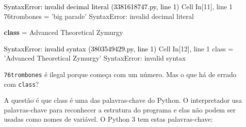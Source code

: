 \documentclass[
  brazilian,
  letterpaper,
  DIV=11,
  numbers=noendperiod]{scrreprt}
\newenvironment{Shaded}{\begin{snugshade}}{\end{snugshade}}
\newcommand{\KeywordTok}[1]{\textcolor[rgb]{0.00,0.23,0.31}{\textbf{#1}}}
\newcommand{\OperatorTok}[1]{\textcolor[rgb]{0.37,0.37,0.37}{#1}}
\newcommand{\StringTok}[1]{\textcolor[rgb]{0.13,0.47,0.30}{#1}}
\begin{document}
\begin{Highlighting}
\textcolor{black}{SyntaxError: invalid decimal literal (3381618747.py, line 1)}
\textcolor{black}{  }\textcolor{QuartoInternalColor1}{Cell}\textcolor{QuartoInternalColor2}{}\textcolor{QuartoInternalColor1}{ }\textcolor{QuartoInternalColor2}{}\textcolor{QuartoInternalColor3}{In[11]}\textcolor{QuartoInternalColor2}{}\textcolor{QuartoInternalColor3}{, line 1}\textcolor{QuartoInternalColor2}{}
\textcolor{QuartoInternalColor2}{}\textcolor{QuartoInternalColor4}{    }\textcolor{QuartoInternalColor2}{}\textcolor{QuartoInternalColor4}{76trombones = 'big parade'}\textcolor{QuartoInternalColor2}{}
\textcolor{QuartoInternalColor2}{     \textasciicaret{}}
\textcolor{QuartoInternalColor2}{}\textcolor{QuartoInternalColor4}{SyntaxError}\textcolor{QuartoInternalColor2}{}\textcolor{QuartoInternalColor4}{:}\textcolor{QuartoInternalColor2}{ invalid decimal literal}
\end{Highlighting}

\begin{Shaded}
\begin{Highlighting}[]
\KeywordTok{class} \OperatorTok{=} \StringTok{\textquotesingle{}Advanced Theoretical Zymurgy\textquotesingle{}}
\end{Highlighting}
\end{Shaded}

\begin{Highlighting}
\textcolor{black}{SyntaxError: invalid syntax (3803549429.py, line 1)}
\textcolor{black}{  }\textcolor{QuartoInternalColor1}{Cell}\textcolor{QuartoInternalColor2}{}\textcolor{QuartoInternalColor1}{ }\textcolor{QuartoInternalColor2}{}\textcolor{QuartoInternalColor3}{In[12]}\textcolor{QuartoInternalColor2}{}\textcolor{QuartoInternalColor3}{, line 1}\textcolor{QuartoInternalColor2}{}
\textcolor{QuartoInternalColor2}{}\textcolor{QuartoInternalColor4}{    }\textcolor{QuartoInternalColor2}{}\textcolor{QuartoInternalColor4}{class = 'Advanced Theoretical Zymurgy'}\textcolor{QuartoInternalColor2}{}
\textcolor{QuartoInternalColor2}{          \textasciicaret{}}
\textcolor{QuartoInternalColor2}{}\textcolor{QuartoInternalColor4}{SyntaxError}\textcolor{QuartoInternalColor2}{}\textcolor{QuartoInternalColor4}{:}\textcolor{QuartoInternalColor2}{ invalid syntax}
\end{Highlighting}

\texttt{76trombones} é ilegal porque começa com um número. Mas o que há
de errado com \texttt{class}?

A questão é que class é uma das palavras-chave do Python. O
interpretador usa palavras-chave para reconhecer a estrutura do programa
e elas não podem ser usadas como nomes de variável. O Python 3 tem estas
palavras-chave:
\end{document}
